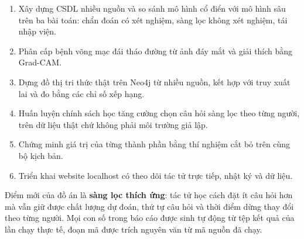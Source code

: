 \begin{enumerate}
  \item Xây dựng CSDL nhiều nguồn và so sánh mô hình cổ điển với mô hình sâu trên ba bài toán: chẩn đoán có xét nghiệm, sàng lọc không xét nghiệm, tái nhập viện.
  \item Phân cấp bệnh võng mạc đái tháo đường từ ảnh đáy mắt và giải thích bằng Grad-CAM.
  \item Dựng đồ thị tri thức thật trên Neo4j từ nhiều nguồn, kết hợp với truy xuất lai và đo bằng các chỉ số xếp hạng.
  \item Huấn luyện chính sách học tăng cường chọn câu hỏi sàng lọc theo từng người, trên dữ liệu thật chứ không phải môi trường giả lập.
  \item Chứng minh giá trị của từng thành phần bằng thí nghiệm cắt bỏ trên cùng bộ kịch bản.
  \item Triển khai website localhost có theo dõi tác tử trực tiếp, nhật ký và dữ liệu.
\end{enumerate}

Điểm mới của đồ án là \textbf{sàng lọc thích ứng}: tác tử học cách đặt ít câu hỏi hơn mà vẫn giữ được chất lượng dự đoán, thứ tự câu hỏi và thời điểm dừng thay đổi theo từng người. Mọi con số trong báo cáo được sinh tự động từ tệp kết quả của lần chạy thực tế, đoạn mã được trích nguyên văn từ mã nguồn đã chạy.
